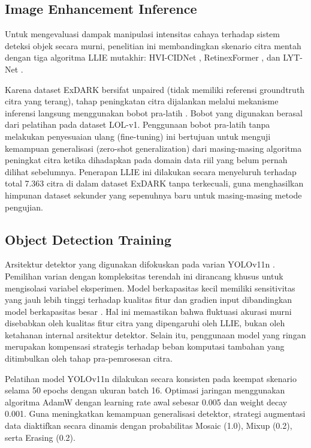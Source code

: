 \documentclass[conference]{IEEEtran}
\begin{document}
\subsection{Image Enhancement Inference}
Untuk mengevaluasi dampak manipulasi intensitas cahaya terhadap sistem deteksi objek secara murni, penelitian ini membandingkan skenario citra mentah dengan tiga algoritma LLIE mutakhir: HVI-CIDNet \cite{yan2025hvi}, RetinexFormer \cite{cai2023retinexformer}, dan LYT-Net \cite{brateanu2025lytnet}. 

Karena dataset ExDARK bersifat unpaired (tidak memiliki referensi groundtruth citra yang terang), tahap peningkatan citra dijalankan melalui mekanisme inferensi langsung menggunakan bobot pra-latih \cite{hvicidnet2025,retinexformer2023,lytnets2024}. Bobot yang digunakan berasal dari pelatihan pada dataset LOL-v1. Penggunaan bobot pra-latih tanpa melakukan penyesuaian ulang (fine-tuning) ini bertujuan untuk menguji kemampuan generalisasi (zero-shot generalization) dari masing-masing algoritma peningkat citra ketika dihadapkan pada domain data riil yang belum pernah dilihat sebelumnya. Penerapan LLIE ini dilakukan secara menyeluruh terhadap total 7.363 citra di dalam dataset ExDARK tanpa terkecuali, guna menghasilkan himpunan dataset sekunder yang sepenuhnya baru untuk masing-masing metode pengujian.

\subsection{Object Detection Training}
Arsitektur detektor yang digunakan difokuskan pada varian YOLOv11n \cite{khanam2024yolov11}. Pemilihan varian dengan kompleksitas terendah ini dirancang khusus untuk mengisolasi variabel eksperimen. Model berkapasitas kecil memiliki sensitivitas yang jauh lebih tinggi terhadap kualitas fitur dan gradien input dibandingkan model berkapasitas besar \cite{dobrzycki2025freezing}. Hal ini memastikan bahwa fluktuasi akurasi murni disebabkan oleh kualitas fitur citra yang dipengaruhi oleh LLIE, bukan oleh ketahanan internal arsitektur detektor. Selain itu, penggunaan model yang ringan merupakan kompensasi strategis terhadap beban komputasi tambahan yang ditimbulkan oleh tahap pra-pemrosesan citra.

Pelatihan model YOLOv11n dilakukan secara konsisten pada keempat skenario selama 50 epochs dengan ukuran batch 16. Optimasi jaringan menggunakan algoritma AdamW dengan learning rate awal sebesar 0.005 dan weight decay 0.001. Guna meningkatkan kemampuan generalisasi detektor, strategi augmentasi data diaktifkan secara dinamis dengan probabilitas Mosaic (1.0), Mixup (0.2), serta Erasing (0.2).
\end{document}
